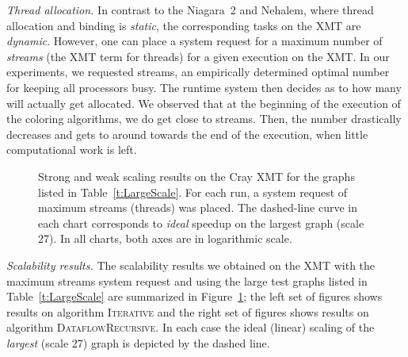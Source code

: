 \documentclass{article}
\begin{document}
{\em Thread allocation. }
In contrast to the Niagara~2 and Nehalem, where thread allocation and binding is {\em static}, 
the corresponding tasks on the XMT are {\em dynamic}. 
However, one can place a system request for a maximum number of {\em streams} 
(the XMT term for threads) for a given execution on the XMT. 
In our experiments, we requested  streams,
an empirically determined optimal number for keeping all processors busy. 
The runtime system then decides as to how many will actually get allocated. 
We observed that at the beginning of the execution of the coloring algorithms, 
we do get close to  streams. Then, the number drastically decreases 
and gets to around  towards the end of the execution, when little computational work is left. 


\begin{figure}
\centering
{}
\caption{\small Strong and weak scaling results on the Cray XMT for the graphs 
listed in Table~\ref{t:LargeScale}. 
For each run, a system request of maximum  streams (threads) was placed. 
The dashed-line curve in each chart corresponds to {\em ideal} speedup 
on the largest graph (scale 27).
In all charts, both axes are in logarithmic scale.}
\label{f:xl}
\end{figure}

{\em Scalability results. }
The scalability results we obtained on the XMT with the maximum  streams system request  
and using the large test graphs listed in Table~\ref{t:LargeScale} are summarized in Figure~\ref{f:xl};
the left set of figures shows results on algorithm \textsc{\textsc{Iterative}} and the right set of figures shows
results on algorithm \textsc{DataflowRecursive}.
In each case the ideal (linear) scaling of the {\em largest} (scale 27) graph is depicted by  the dashed line.
\end{document}

